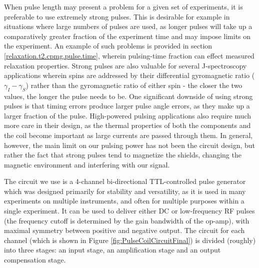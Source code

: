 \documentclass[PaulGanssle-Thesis.tex]{subfiles}
\begin{document}
When pulse length may present a problem for a given set of experiments, it is preferable to use extremely strong pulses. This is desirable for example in situations where large numbers of pulses are used, as longer pulses will take up a comparatively greater fraction of the experiment time and may impose limits on the experiment. An example of such problems is provided in section \ref{relaxation.t2.cpmg.pulse.time}, wherein pulsing-time fraction can effect measured relaxation properties. Strong pulses are also valuable for several J-spectroscopy applications wherein spins are addressed by their differential gyromagnetic ratio ($\gamma_I - \gamma_S$) rather than the gyromagnetic ratio of either spin - the closer the two values, the longer the pulse needs to be. One significant downside of using strong pulses is that timing errors produce larger pulse angle errors, as they make up a larger fraction of the pulse. High-powered pulsing applications also require much more care in their design, as the thermal properties of both the components and the coil become important as large currents are passed through them. In general, however, the main limit on our pulsing power has not been the circuit design, but rather the fact that strong pulses tend to magnetize the shields, changing the magnetic environment and interfering with our signal.

The circuit we use is a 4-channel bi-directional TTL-controlled pulse generator which was designed primarily for stability and versatility, as it is used in many experiments on multiple instruments, and often for multiple purposes within a single experiment. It can be used to deliver either DC or low-frequency RF pulses (the frequency cutoff is determined by the gain bandwidth of the op-amp), with maximal symmetry between positive and negative output. The circuit for each channel (which is shown in Figure \ref{fig:PulseCoilCircuitFinal}) is divided (roughly) into three stages: an input stage, an amplification stage and an output compensation stage.
\end{document}
